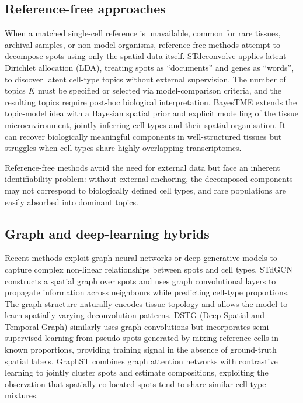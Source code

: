 \subsection{Reference-free approaches}

When a matched single-cell reference is unavailable, common for rare tissues, archival samples, or non-model organisms, reference-free methods attempt to decompose spots using only the spatial data itself. STdeconvolve \citep{hao2023stdeconvolve} applies latent Dirichlet allocation (LDA), treating spots as ``documents'' and genes as ``words'', to discover latent cell-type topics without external supervision. The number of topics $K$ must be specified or selected via model-comparison criteria, and the resulting topics require post-hoc biological interpretation. BayesTME extends the topic-model idea with a Bayesian spatial prior and explicit modelling of the tissue microenvironment, jointly inferring cell types and their spatial organisation. It can recover biologically meaningful components in well-structured tissues but struggles when cell types share highly overlapping transcriptomes.

Reference-free methods avoid the need for external data but face an inherent identifiability problem: without external anchoring, the decomposed components may not correspond to biologically defined cell types, and rare populations are easily absorbed into dominant topics.

\subsection{Graph and deep-learning hybrids}

Recent methods exploit graph neural networks or deep generative models to capture complex non-linear relationships between spots and cell types. STdGCN constructs a spatial graph over spots and uses graph convolutional layers to propagate information across neighbours while predicting cell-type proportions. The graph structure naturally encodes tissue topology and allows the model to learn spatially varying deconvolution patterns. DSTG (Deep Spatial and Temporal Graph) \citep{song2021stdgcn} similarly uses graph convolutions but incorporates semi-supervised learning from pseudo-spots generated by mixing reference cells in known proportions, providing training signal in the absence of ground-truth spatial labels. GraphST \citep{long2023spatially} combines graph attention networks with contrastive learning to jointly cluster spots and estimate compositions, exploiting the observation that spatially co-located spots tend to share similar cell-type mixtures.


